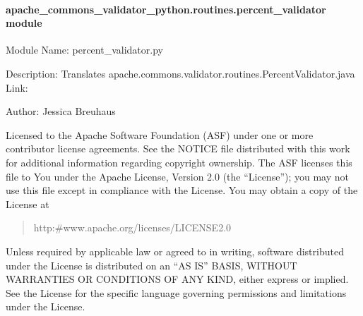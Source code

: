 \documentclass[letterpaper,10pt,english]{sphinxmanual}
\begin{document}
\paragraph{apache\_commons\_validator\_python.routines.percent\_validator module}
\label{\detokenize{apache_commons_validator_python.routines:module-apache_commons_validator_python.routines.percent_validator}}\label{\detokenize{apache_commons_validator_python.routines:apache-commons-validator-python-routines-percent-validator-module}}
\sphinxAtStartPar
Module Name: percent\_validator.py

\sphinxAtStartPar
Description: Translates apache.commons.validator.routines.PercentValidator.java
Link: 

\sphinxAtStartPar
Author: Jessica Breuhaus
\begin{description}
\sphinxAtStartPar
Licensed to the Apache Software Foundation (ASF) under one or more
contributor license agreements.  See the NOTICE file distributed with
this work for additional information regarding copyright ownership.
The ASF licenses this file to You under the Apache License, Version 2.0
(the “License”); you may not use this file except in compliance with
the License.  You may obtain a copy of the License at
\begin{quote}

\sphinxAtStartPar
http:\#www.apache.org/licenses/LICENSE\sphinxhyphen{}2.0
\end{quote}

\sphinxAtStartPar
Unless required by applicable law or agreed to in writing, software
distributed under the License is distributed on an “AS IS” BASIS,
WITHOUT WARRANTIES OR CONDITIONS OF ANY KIND, either express or implied.
See the License for the specific language governing permissions and
limitations under the License.

\end{description}
\end{document}
